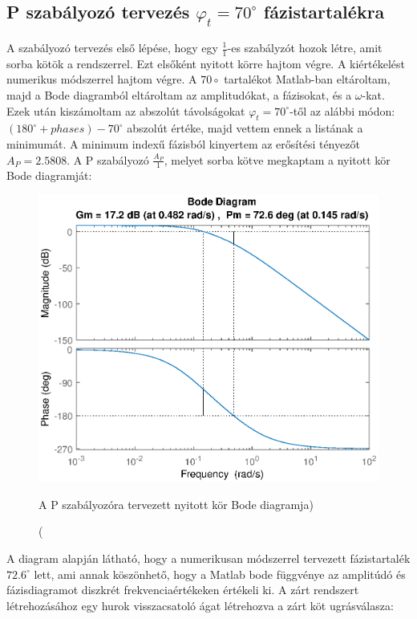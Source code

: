\documentclass[12pt]{article}
\begin{document}
\subsection{P szabályozó tervezés $\varphi_t=70^\circ$ fázistartalékra}
A szabályozó tervezés első lépése, hogy egy $\frac{1}{1}$-es szabályzót hozok létre, amit sorba kötök a rendszerrel. Ezt elsőként nyitott körre hajtom végre. A kiértékelést numerikus módszerrel hajtom végre. A $70\circ$ tartalékot Matlab-ban eltároltam, majd a Bode diagramból eltároltam az amplitudókat, a fázisokat, és a $\omega$-kat. Ezek után kiszámoltam az abszolút távolságokat  $\varphi_t=70^\circ$-től az alábbi módon:
$(180^\circ+phases)-70^\circ$ abszolút értéke, majd vettem ennek a listának a minimumát. A minimum indexű fázisból kinyertem az erősítési tényezőt $A_P=2.5808$. A P szabályozó $\frac{A_P}{1}$, melyet sorba kötve megkaptam a nyitott kör Bode diagramját:
\begin{figure}[H]
\centering
\includegraphics[scale=.70]{WPLANTPIDOPENLOOPMARGIN}
\caption(A P szabályozóra tervezett nyitott kör Bode diagramja)
\end{figure}
A diagram alapján látható, hogy a numerikusan módszerrel tervezett fázistartalék $72.6^\circ$ lett, ami annak köszönhető, hogy a Matlab bode függvénye az amplitúdó és fázisdiagramot diszkrét frekvenciaértékeken értékeli ki. A zárt rendszert létrehozásához egy hurok visszacsatoló ágat létrehozva a zárt köt ugrásválasza:
\end{document}
